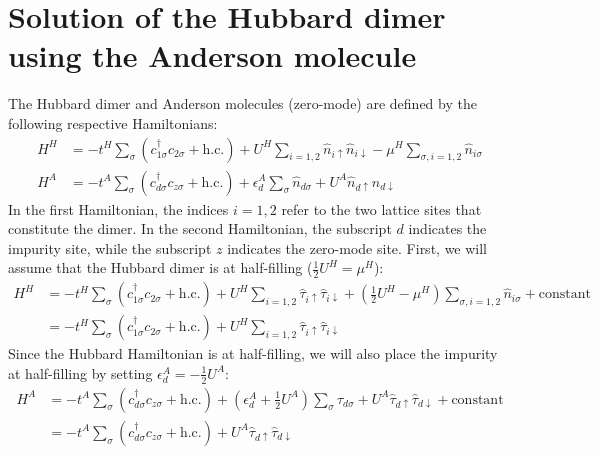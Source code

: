 \documentclass[12pt]{article}
\numberwithin{equation}{section}
\begin{document}
\section{Solution of the Hubbard dimer using the Anderson molecule}
The Hubbard dimer and Anderson molecules (zero-mode) are defined by the following respective Hamiltonians:
\begin{equation}\begin{aligned}
	H^H &= -t^H\sum_{\sigma}\left(c^\dagger_{1\sigma}c_{2\sigma} + \text{h.c.}\right) + U^H\sum_{i=1,2}\hat n_{i \uparrow}\hat n_{i \downarrow} - \mu^H \sum_{\sigma, i=1,2}\hat n_{i\sigma}\\
	H^A &= -t^A\sum_{\sigma}\left(c^\dagger_{d\sigma}c_{z\sigma} + \text{h.c.}\right) + \epsilon_d^A \sum_{\sigma}\hat n_{d\sigma} + U^A\hat n_{d \uparrow}\hat n_{d \downarrow}
\end{aligned}\end{equation}
In the first Hamiltonian, the indices \(i=1,2\) refer to the two lattice sites that constitute the dimer. In the second Hamiltonian, the subscript \(d\) indicates the impurity site, while the subscript \(z\) indicates the zero-mode site. First, we will assume that the Hubbard dimer is at half-filling (\(\frac{1}{2}U^H = \mu^H\)):
\begin{equation}\begin{aligned}
	\label{hubb_dimer}
	H^H &= -t^H\sum_{\sigma}\left(c^\dagger_{1\sigma}c_{2\sigma} + \text{h.c.}\right) + U^H\sum_{i=1,2}\hat \tau_{i \uparrow}\hat \tau_{i \downarrow} + \left(\frac{1}{2}U^H- \mu^H\right) \sum_{\sigma, i=1,2}\hat n_{i\sigma} + \text{constant}\\
	    &= -t^H\sum_{\sigma}\left(c^\dagger_{1\sigma}c_{2\sigma} + \text{h.c.}\right) + U^H\sum_{i=1,2}\hat \tau_{i \uparrow}\hat \tau_{i \downarrow}
\end{aligned}\end{equation}
Since the Hubbard Hamiltonian is at half-filling, we will also place the impurity at half-filling by setting \(\epsilon_d^A = -\frac{1}{2}U^A\):
\begin{equation}\begin{aligned}
	\label{and_dimer}
	H^A &= -t^A\sum_{\sigma}\left(c^\dagger_{d\sigma}c_{z\sigma} + \text{h.c.}\right) + \left(\epsilon_d^A + \frac{1}{2}U^A\right) \sum_{\sigma}\hat \tau_{d\sigma} + U^A\hat \tau_{d \uparrow}\hat \tau_{d \downarrow} + \text{constant}\\
	    &= -t^A\sum_{\sigma}\left(c^\dagger_{d\sigma}c_{z\sigma} + \text{h.c.}\right) + U^A\hat \tau_{d \uparrow}\hat \tau_{d \downarrow}
\end{aligned}\end{equation}
\end{document}
